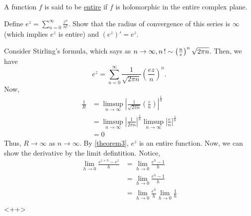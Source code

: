 \documentclass[11pt]{article}
\begin{document}
\begin{definition}
A function $f$ is said to be \underline{entire} if $f$ is holomorphic in the
entire complex plane.
\end{definition}
\begin{example}
Define $\displaystyle e^z = \sum^\infty_{n=0}\frac{z^n}{n!}$. Show that the
radius of convergence of this series is $\infty$ (which implies $e^z$ is entire)
and $(e^z)' = e^z$.
\end{example}
Consider Stirling's formula, which says as $n\to\infty, n\operatorname{!} \sim
\left(\frac{n}{e}\right)^n\sqrt{2\pi n}$. Then, we have
\begin{equation*}
e^z = \sum^\infty_{n=0} \frac{1}{\sqrt{2\pi n}}\left( \frac{ez}{n}\right)^n.
\end{equation*}
Now,
\begin{align*}
\frac{1}{R}
&= \limsup_{n\to\infty}\left| \frac{1}{\sqrt{2\pi
n}}\left(\frac{e}{n}\right)\right|^{\frac{1}{n}}\\
&= \limsup_{n\to\infty}\left| \frac{1}{2\pi n} \right|^{\frac{1}{n}}
\limsup_{n\to\infty}\left| \frac{e}{n} \right|^{\frac{1}{n}}\\
&= 0
\end{align*}
Thus, $R \to \infty$ as $n \to \infty$. By \cref{theorem3}, $e^z$ is an entire
function. Now, we can show the derivative by the limit defintition. Notice,
\begin{align*}
\lim_{h \to 0}\frac{e^{z+h} - e^z}{h}
&= \lim_{h \to 0}\frac{e^{h} - 1}{h}\\
&= \lim_{h \to 0}\frac{e^{h} - 1}{h}\\
&= \lim_{h \to 0}\frac{e^{h}}{h}\lim_{h \to 0}\frac{1}{h}\\
\end{align*}<++>
\end{document}
